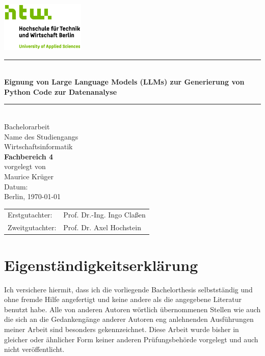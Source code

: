 \documentclass[11pt,a4paper]{article}
\begin{document}
\begin{titlepage}
    \centering
    
    \includegraphics[width=4cm]{./bilder/S04_HTW_Berlin_Logo_pos_FARBIG_RGB.jpg}\\[1.0cm]
    \rule{\linewidth}{0.5pt}\\[0.7cm]
    
    {\color{htwgreen}\bfseries\Large Eignung von Large Language Models (LLMs) zur Generierung von Python Code zur
    Datenanalyse}\\[0.5cm]
    \rule{\linewidth}{0.5pt}\\[2.0cm]
    {\large Bachelorarbeit}\\[1.5cm]
    
    {\large Name des Studiengangs}\\
    {\LARGE Wirtschaftsinformatik}\\[0.3cm]
    {\color{htwgreen}\LARGE \textbf{Fachbereich 4}}\\[1.5cm]
    
    {vorgelegt von}\\
    {\LARGE Maurice Krüger}\\[3cm]
    
    {\Large Datum:}\\
    Berlin, \today\\[2.5cm]

    {\LARGE
    \begin{tabular}{l l}
        Erstgutachter:  & Prof. Dr.-Ing. Ingo Claßen \\
        Zweitgutachter: & Prof. Dr. Axel Hochstein \\
    \end{tabular}
    }

\end{titlepage}

\section*{Eigenständigkeitserklärung}
\label{sec:eigenstaendigkeitserklaerung}
Ich versichere hiermit, dass ich die vorliegende Bachelorthesis selbstständig und ohne fremde Hilfe angefertigt und keine andere als die angegebene Literatur benutzt habe. Alle von anderen Autoren wörtlich übernommenen Stellen wie auch die sich an die Gedankengänge anderer Autoren eng anlehnenden Ausführungen meiner Arbeit sind besonders gekennzeichnet. Diese Arbeit wurde bisher in gleicher oder ähnlicher Form keiner anderen Prüfungsbehörde vorgelegt und auch nicht veröffentlicht.
\\\\
\end{document}

